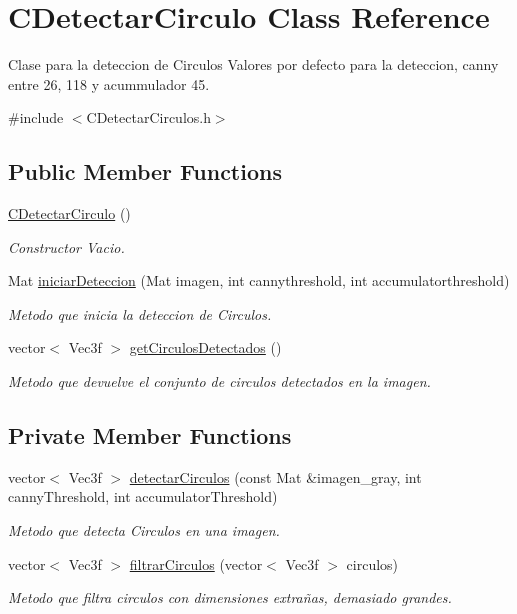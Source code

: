 \hypertarget{classCDetectarCirculo}{}\section{C\+Detectar\+Circulo Class Reference}
\label{classCDetectarCirculo}


Clase para la deteccion de Circulos Valores por defecto para la deteccion, canny entre 26, 118 y acummulador 45.  




{\ttfamily \#include $<$C\+Detectar\+Circulos.\+h$>$}

\subsection*{Public Member Functions}
\begin{DoxyCompactItemize}
\item 
\hyperlink{classCDetectarCirculo_a1afdf8a823810d47823414ebcb6850a9}{C\+Detectar\+Circulo} ()
\begin{DoxyCompactList}\small\item\em Constructor Vacio. \end{DoxyCompactList}\item 
Mat \hyperlink{classCDetectarCirculo_a649c9f3888f669032bd3811c902d0ef9}{iniciar\+Deteccion} (Mat imagen, int cannythreshold, int accumulatorthreshold)
\begin{DoxyCompactList}\small\item\em Metodo que inicia la deteccion de Circulos. \end{DoxyCompactList}\item 
vector$<$ Vec3f $>$ \hyperlink{classCDetectarCirculo_a6521238e2bf5be28294aa480ad0933ba}{get\+Circulos\+Detectados} ()
\begin{DoxyCompactList}\small\item\em Metodo que devuelve el conjunto de circulos detectados en la imagen. \end{DoxyCompactList}\end{DoxyCompactItemize}
\subsection*{Private Member Functions}
\begin{DoxyCompactItemize}
\item 
vector$<$ Vec3f $>$ \hyperlink{classCDetectarCirculo_ad6b02b2bc1fbb78ce6d1c1a5d51522f6}{detectar\+Circulos} (const Mat \&imagen\+\_\+gray, int canny\+Threshold, int accumulator\+Threshold)
\begin{DoxyCompactList}\small\item\em Metodo que detecta Circulos en una imagen. \end{DoxyCompactList}\item 
vector$<$ Vec3f $>$ \hyperlink{classCDetectarCirculo_adc8cdab3f0446334d56e9ac08b304639}{filtrar\+Circulos} (vector$<$ Vec3f $>$ circulos)
\begin{DoxyCompactList}\small\item\em Metodo que filtra circulos con dimensiones extrañas, demasiado grandes. \end{DoxyCompactList}\end{DoxyCompactItemize}
